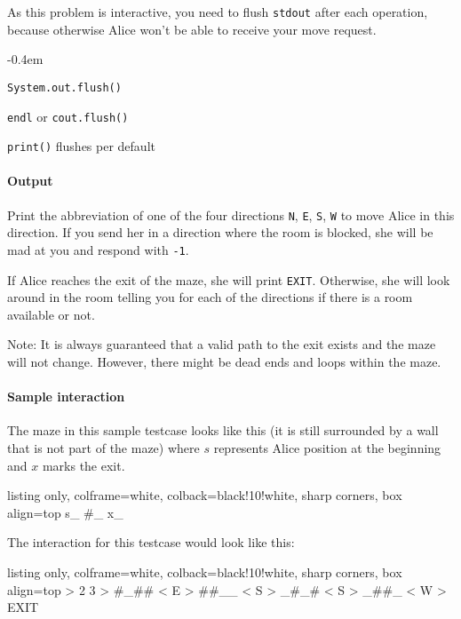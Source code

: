 As this problem is interactive, you need to flush \texttt{stdout} after each operation, because otherwise Alice won't be able to receive your move request.
\begin{description}
	\itemsep-0.4em
	\item[Java:] \texttt{System.out.flush()}
	\item[C++:] \texttt{endl} or \texttt{cout.flush()}
  \item[Python] \texttt{print()} flushes per default
\end{description}

\paragraph*{Output}

Print the abbreviation of one of the four directions \texttt{N}, \texttt{E}, \texttt{S}, \texttt{W} to move Alice in this direction. If you send her in a direction where the room is blocked, she will be mad at you and respond with \texttt{-1}.

If Alice reaches the exit of the maze, she will print \texttt{EXIT}. Otherwise, she will look around in the room telling you for each of the directions if there is a room available or not.

Note: It is always guaranteed that a valid path to the exit exists and the maze will not change. However, there might be dead ends and loops within the maze.

\paragraph*{Sample interaction}

The maze in this sample testcase looks like this (it is still surrounded by a wall that is not part of the maze) where $s$ represents Alice position at the beginning and $x$ marks the exit.

\noindent\begin{tcblisting}{listing only, colframe=white, colback=black!10!white, sharp corners, box align=top}
s_
#_
x_
\end{tcblisting}

The interaction for this testcase would look like this:

\noindent\begin{tcblisting}{listing only, colframe=white, colback=black!10!white, sharp corners, box align=top}
> 2 3
> #_##
< E
> ##__
< S
> _#_#
< S
> _##_
< W
> EXIT
\end{tcblisting}

